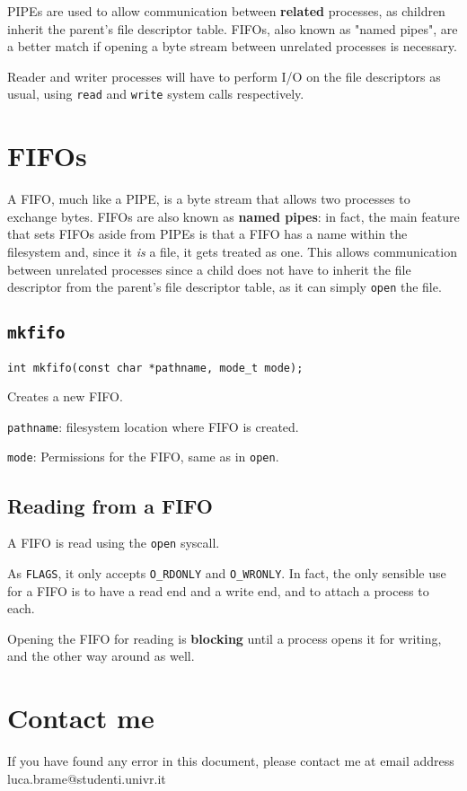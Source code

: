 \documentclass{article}
\begin{document}
PIPEs are used to allow communication between \textbf{related} processes, as children inherit the parent's file descriptor table. FIFOs, also known as "named pipes", are a better match if opening a byte stream between unrelated processes is necessary.

Reader and writer processes will have to perform I/O on the file descriptors as usual, using \texttt{read} and \texttt{write} system calls respectively.


\section{FIFOs}

A FIFO, much like a PIPE, is a byte stream that allows two processes to exchange bytes. FIFOs are also known as \textbf{named pipes}: in fact, the main feature that sets FIFOs aside from PIPEs is that a FIFO has a name within the filesystem and, since it \textit{is} a file, it gets treated as one. This allows communication between unrelated processes since a child does not have to inherit the file descriptor from the parent's file descriptor table, as it can simply \texttt{open} the file.

\subsection{\texttt{mkfifo}}

\begin{verbatim}
int mkfifo(const char *pathname, mode_t mode);
\end{verbatim}

Creates a new FIFO.

\texttt{pathname}: filesystem location where FIFO is created.

\texttt{mode}: Permissions for the FIFO, same as in \texttt{open}.


\subsection{Reading from a FIFO}

A FIFO is read using the \texttt{open} syscall.

As \texttt{FLAGS}, it only accepts \texttt{O\_RDONLY} and \texttt{O\_WRONLY}. In fact, the only sensible use for a FIFO is to have a read end and a write end, and to attach a process to each.

Opening the FIFO for reading is \textbf{blocking} until a process opens it for writing, and the other way around as well.


\section{Contact me}

If you have found any error in this document, please contact me at email address luca.brame@studenti.univr.it
\end{document}

